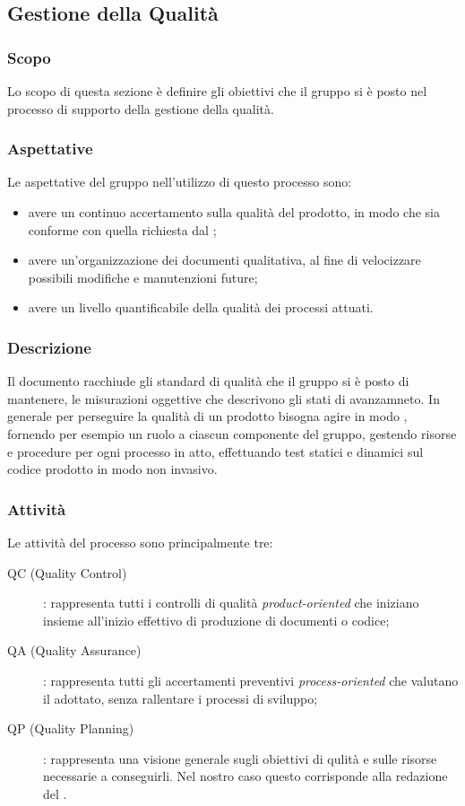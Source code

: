 \subsection{Gestione della Qualità}
\subsubsection{Scopo}
Lo scopo di questa sezione è definire gli obiettivi che il gruppo si è posto nel processo di supporto della gestione della qualità. 

\subsubsection{Aspettative}
Le aspettative del gruppo \Gruppo{} nell'utilizzo di questo processo sono:
\begin{itemize}
	\item avere un continuo accertamento sulla qualità del prodotto, in modo che sia conforme con quella richiesta dal ;
	\item avere un'organizzazione dei documenti qualitativa, al fine di velocizzare possibili modifiche e manutenzioni future;
	\item avere un livello quantificabile della qualità dei processi attuati.
\end{itemize}

\subsubsection{Descrizione}
Il documento \PdQv racchiude gli standard di qualità che il gruppo si è posto di mantenere, le misurazioni oggettive che descrivono gli stati di avanzamneto.
In generale per perseguire la qualità di un prodotto bisogna agire in modo , fornendo per esempio un ruolo a ciascun componente del gruppo, gestendo risorse e procedure per ogni processo in atto, effettuando test statici e dinamici sul codice prodotto in modo non invasivo.

\subsubsection{Attività}
Le attività del processo sono principalmente tre:
\begin{description}
	\item[QC (Quality Control)] : rappresenta tutti i controlli di qualità \textit{product-oriented} che iniziano insieme all'inizio effettivo di produzione di documenti o codice;
	\item[QA (Quality Assurance)] : rappresenta tutti gli accertamenti preventivi \textit{process-oriented} che valutano il  adottato, senza rallentare i processi di sviluppo;
	\item[QP (Quality Planning)] : rappresenta una visione generale sugli obiettivi di qulità e sulle risorse necessarie a conseguirli. Nel nostro caso questo corrisponde alla redazione del \PdQv.
\end{description}

